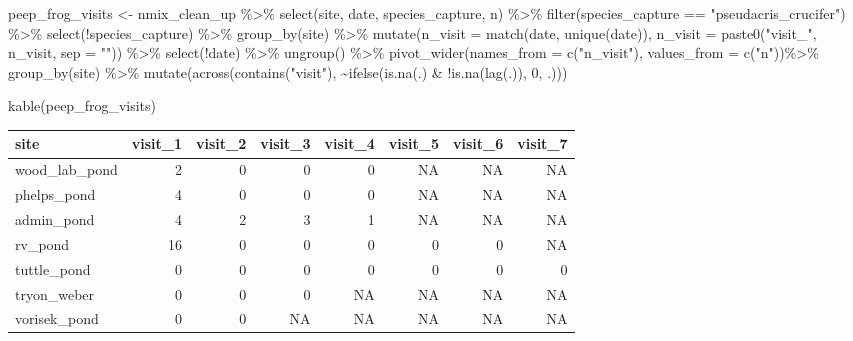 \documentclass[
  letterpaper,
  DIV=11,
  numbers=noendperiod]{scrartcl}
\newenvironment{Shaded}{\begin{snugshade}}{\end{snugshade}}
\newcommand{\AttributeTok}[1]{\textcolor[rgb]{0.40,0.45,0.13}{#1}}
\newcommand{\DecValTok}[1]{\textcolor[rgb]{0.68,0.00,0.00}{#1}}
\newcommand{\FunctionTok}[1]{\textcolor[rgb]{0.28,0.35,0.67}{#1}}
\newcommand{\NormalTok}[1]{\textcolor[rgb]{0.00,0.23,0.31}{#1}}
\newcommand{\OtherTok}[1]{\textcolor[rgb]{0.00,0.23,0.31}{#1}}
\newcommand{\SpecialCharTok}[1]{\textcolor[rgb]{0.37,0.37,0.37}{#1}}
\newcommand{\StringTok}[1]{\textcolor[rgb]{0.13,0.47,0.30}{#1}}
\begin{document}
\begin{Shaded}
\begin{Highlighting}[]
\NormalTok{peep\_frog\_visits }\OtherTok{\textless{}{-}}\NormalTok{ nmix\_clean\_up }\SpecialCharTok{\%\textgreater{}\%} 
  \FunctionTok{select}\NormalTok{(site, date, species\_capture, n) }\SpecialCharTok{\%\textgreater{}\%} 
  \FunctionTok{filter}\NormalTok{(species\_capture }\SpecialCharTok{==} \StringTok{"pseudacris\_crucifer"}\NormalTok{) }\SpecialCharTok{\%\textgreater{}\%} 
  \FunctionTok{select}\NormalTok{(}\SpecialCharTok{!}\NormalTok{species\_capture) }\SpecialCharTok{\%\textgreater{}\%} 
  \FunctionTok{group\_by}\NormalTok{(site) }\SpecialCharTok{\%\textgreater{}\%} 
  \FunctionTok{mutate}\NormalTok{(}\AttributeTok{n\_visit =} \FunctionTok{match}\NormalTok{(date, }\FunctionTok{unique}\NormalTok{(date)),}
         \AttributeTok{n\_visit =} \FunctionTok{paste0}\NormalTok{(}\StringTok{"visit\_"}\NormalTok{, n\_visit, }\AttributeTok{sep =} \StringTok{""}\NormalTok{)) }\SpecialCharTok{\%\textgreater{}\%} 
  \FunctionTok{select}\NormalTok{(}\SpecialCharTok{!}\NormalTok{date) }\SpecialCharTok{\%\textgreater{}\%} 
  \FunctionTok{ungroup}\NormalTok{() }\SpecialCharTok{\%\textgreater{}\%}
  \FunctionTok{pivot\_wider}\NormalTok{(}\AttributeTok{names\_from =} \FunctionTok{c}\NormalTok{(}\StringTok{"n\_visit"}\NormalTok{), }\AttributeTok{values\_from =} \FunctionTok{c}\NormalTok{(}\StringTok{"n"}\NormalTok{))}\SpecialCharTok{\%\textgreater{}\%} 
  \FunctionTok{group\_by}\NormalTok{(site) }\SpecialCharTok{\%\textgreater{}\%} 
  \FunctionTok{mutate}\NormalTok{(}\FunctionTok{across}\NormalTok{(}\FunctionTok{contains}\NormalTok{(}\StringTok{"visit"}\NormalTok{), }
                \SpecialCharTok{\textasciitilde{}}\FunctionTok{ifelse}\NormalTok{(}\FunctionTok{is.na}\NormalTok{(.) }\SpecialCharTok{\&}
                          \SpecialCharTok{!}\FunctionTok{is.na}\NormalTok{(}\FunctionTok{lag}\NormalTok{(.)), }\DecValTok{0}\NormalTok{, .)))}


\FunctionTok{kable}\NormalTok{(peep\_frog\_visits)}
\end{Highlighting}
\end{Shaded}

\begin{tabular}{l|r|r|r|r|r|r|r}
\hline
site & visit\_1 & visit\_2 & visit\_3 & visit\_4 & visit\_5 & visit\_6 & visit\_7\\
\hline
wood\_lab\_pond & 2 & 0 & 0 & 0 & NA & NA & NA\\
\hline
phelps\_pond & 4 & 0 & 0 & 0 & NA & NA & NA\\
\hline
admin\_pond & 4 & 2 & 3 & 1 & NA & NA & NA\\
\hline
rv\_pond & 16 & 0 & 0 & 0 & 0 & 0 & NA\\
\hline
tuttle\_pond & 0 & 0 & 0 & 0 & 0 & 0 & 0\\
\hline
tryon\_weber & 0 & 0 & 0 & NA & NA & NA & NA\\
\hline
vorisek\_pond & 0 & 0 & NA & NA & NA & NA & NA\\
\hline
\end{tabular}
\end{document}
